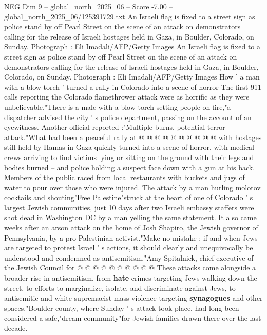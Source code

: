 \begin{textsample}{NEG Dim 9 – global\_north\_2025\_06 – Score -7.00 – global\_north\_2025\_06/125391729.txt}  \label{ex:f9_neg_099}
An Israeli flag is fixed to a street sign as police stand by off Pearl Street on the scene of an attack on demonstrators calling for the release of Israeli hostages held in Gaza, in Boulder, Colorado, on Sunday.
Photograph : Eli Imadali/AFP/Getty Images An Israeli flag is fixed to a street sign as police stand by off Pearl Street on the scene of an attack on demonstrators calling for the release of Israeli hostages held in Gaza, in Boulder, Colorado, on Sunday.
Photograph : Eli Imadali/AFP/Getty Images How ' a man with a blow torch ' turned a rally in Colorado into a scene of horror The first 911 calls reporting the Colorado flamethrower attack were as horrific as they were unbelievable."There is a male with a blow torch setting people on fire,"a dispatcher advised the city ' s police department, passing on the account of an eyewitness.
Another official reported :"Multiple burns, potential terror attack."What had been a peaceful rally at @ @ @ @ @ @ @ @ @ @ with hostages still held by Hamas in Gaza quickly turned into a scene of horror, with medical crews arriving to find victims lying or sitting on the ground with their legs and bodies burned -- and police holding a suspect face down with a gun at his back.
Members of the public raced from local restaurants with buckets and jugs of water to pour over those who were injured.
The attack by a man hurling molotov cocktails and shouting"Free Palestine"struck at the heart of one of Colorado ' s largest Jewish communities, just 10 days after two Israeli embassy staffers were shot dead in Washington DC by a man yelling the same statement.
It also came weeks after an arson attack on the home of Josh Shapiro, the Jewish governor of Pennsylvania, by a pro-Palestinian activist."Make no mistake : if and when Jews are targeted to protest Israel ' s actions, it should clearly and unequivocally be understood and condemned as antisemitism,"Amy Spitalnick, chief executive of the Jewish Council for @ @ @ @ @ @ @ @ @ @ These attacks come alongside a broader rise in antisemitism, from \textbf{hate} crimes targeting Jews walking down the street, to efforts to marginalize, isolate, and discriminate against Jews, to antisemitic and white supremacist mass violence targeting \textbf{synagogues} and other spaces."Boulder county, where Sunday ' s attack took place, had long been considered a safe,"dream community"for Jewish families drawn there over the last decade.

\end{textsample}

